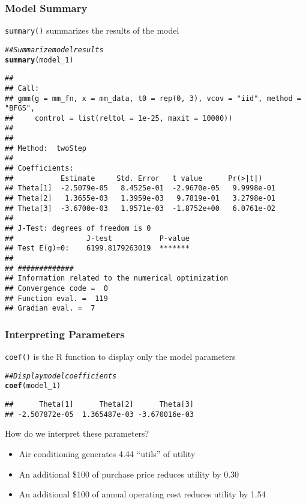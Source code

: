 \documentclass{beamer}\usepackage[]{graphicx}\usepackage[]{color}
\makeatletter
\newcommand{\hlcom}[1]{\textcolor[rgb]{0.678,0.584,0.686}{\textit{#1}}}%
\newcommand{\hlstd}[1]{\textcolor[rgb]{0.345,0.345,0.345}{#1}}%
\newcommand{\hlkwd}[1]{\textcolor[rgb]{0.737,0.353,0.396}{\textbf{#1}}}%
\newenvironment{kframe}{%
 \def\at@end@of@kframe{}%
 \ifinner\ifhmode%
  \def\at@end@of@kframe{\end{minipage}}%
  \begin{minipage}{\columnwidth}%
 \fi\fi%
 \def\FrameCommand##1{\hskip\@totalleftmargin \hskip-\fboxsep
 \colorbox{shadecolor}{##1}\hskip-\fboxsep
     \hskip-\linewidth \hskip-\@totalleftmargin \hskip\columnwidth}%
 \MakeFramed {\advance\hsize-\width
   \@totalleftmargin\z@ \linewidth\hsize
   \@setminipage}}%
 {\par\unskip\endMakeFramed%
 \at@end@of@kframe}
\newenvironment{knitrout}{}{} %
\makeatother
\begin{document}
\begin{frame}[fragile]\frametitle{Model Summary}
    \texttt{summary()} summarizes the results of the model
    \vspace{1ex}
\begin{knitrout}\tiny
{}\color{fgcolor}\begin{kframe}
\begin{alltt}
\hlcom{## Summarize model results}
\hlkwd{summary}\hlstd{(model_1)}
\end{alltt}
\begin{verbatim}
## 
## Call:
## gmm(g = mm_fn, x = mm_data, t0 = rep(0, 3), vcov = "iid", method = "BFGS", 
##     control = list(reltol = 1e-25, maxit = 10000))
## 
## 
## Method:  twoStep 
## 
## Coefficients:
##           Estimate     Std. Error   t value      Pr(>|t|)   
## Theta[1]  -2.5079e-05   8.4525e-01  -2.9670e-05   9.9998e-01
## Theta[2]   1.3655e-03   1.3959e-03   9.7819e-01   3.2798e-01
## Theta[3]  -3.6700e-03   1.9571e-03  -1.8752e+00   6.0761e-02
## 
## J-Test: degrees of freedom is 0 
##                 J-test           P-value        
## Test E(g)=0:    6199.8179263019  *******        
## 
## #############
## Information related to the numerical optimization
## Convergence code =  0 
## Function eval. =  119 
## Gradian eval. =  7
\end{verbatim}
\end{kframe}
\end{knitrout}
\end{frame}

\begin{frame}[fragile]\frametitle{Interpreting Parameters}
    \texttt{coef()} is the R function to display only the model parameters
\begin{knitrout}\footnotesize
{}\color{fgcolor}\begin{kframe}
\begin{alltt}
\hlcom{## Display model coefficients}
\hlkwd{coef}\hlstd{(model_1)}
\end{alltt}
\begin{verbatim}
##      Theta[1]      Theta[2]      Theta[3] 
## -2.507872e-05  1.365487e-03 -3.670016e-03
\end{verbatim}
\end{kframe}
\end{knitrout}
    \vspace{2ex}
    How do we interpret these parameters?
    \begin{itemize}
        \item Air conditioning generates 4.44 ``utils'' of utility
        \item An additional \$100 of purchase price reduces utility by 0.30
        \item An additional \$100 of annual operating cost reduces utility by 1.54
    \end{itemize}
\end{frame}
\end{document}
